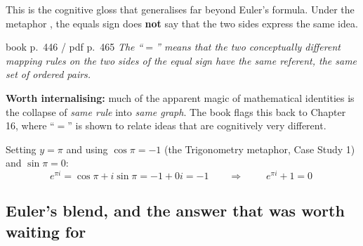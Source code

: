 \begin{keybox}[title={What the ``$=$'' in $e^{iy}=\cos y+i\sin y$ actually means}]
This is the cognitive gloss that generalises far beyond Euler's formula. Under the metaphor
, the equals sign does \textbf{not} say that the two sides
express the same idea.
\begin{center}
\end{center}
\vspace{-3pt}
\begin{bookquote}{book p.~446 / pdf p.~465}
\textit{The ``$=$'' means that the two conceptually different mapping rules on the two sides of the
equal sign have the same referent, the same set of ordered pairs.}
\end{bookquote}
\textbf{Worth internalising:} much of the apparent magic of mathematical identities is the collapse of
\emph{same rule} into \emph{same graph}. The book flags this back to Chapter 16, where ``$=$'' is
shown to relate ideas that are cognitively very different.
\end{keybox}

\noindent Setting $y=\pi$ and using $\cos\pi=-1$ (the Trigonometry metaphor, Case Study 1) and
$\sin\pi=0$:
\[
e^{\pi i}=\cos\pi+i\sin\pi=-1+0i=-1
\qquad\Longrightarrow\qquad
\boxed{\;e^{\pi i}+1=0\;}
\]

\clearpage
\subsection{Euler's blend, and the answer that was worth waiting for}

